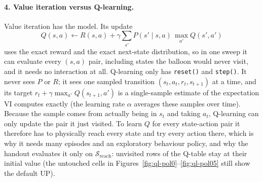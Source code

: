 \documentclass[11pt,letterpaper]{article}
\newcommand{\sreach}{\mathcal{S}_{\mathrm{reach}}}
\begin{document}
\paragraph{4. Value iteration versus Q-learning.}
Value iteration has the model. Its update
\[
Q(s,a) \leftarrow R(s,a) + \gamma \sum_{s'} P(s' \mid s,a)\,
\max_{a'} Q(s',a')
\]
uses the exact reward and the exact next-state distribution, so in one
sweep it can evaluate every $(s,a)$ pair, including states the balloon
would never visit, and it needs no interaction at all. Q-learning only has
\texttt{reset()} and \texttt{step()}. It never sees $P$ or $R$; it sees one
sampled transition $(s_t, a_t, r_t, s_{t+1})$ at a time, and its target
$r_t + \gamma \max_{a'} Q(s_{t+1},a')$ is a single-sample estimate of the
expectation VI computes exactly (the learning rate $\alpha$ averages these
samples over time). Because the sample comes from actually being in $s_t$
and taking $a_t$, Q-learning can only update the pair it just visited. To
learn $Q$ for every state-action pair it therefore has to physically reach
every state and try every action there, which is why it needs many
episodes and an exploratory behaviour policy, and why the handout
evaluates it only on $\sreach$: unvisited rows of the Q-table stay at
their initial value (the untouched cells in
Figures~\ref{fig:ql-pol0}--\ref{fig:ql-pol05} still show the default UP).
\end{document}
